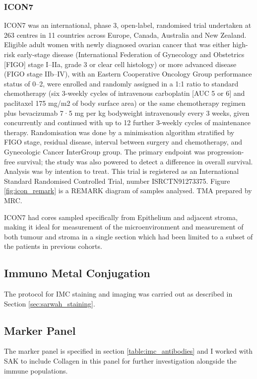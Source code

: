 \subsubsection{ICON7}
ICON7 was an international, phase 3, open-label, randomised trial undertaken at 263 centres in 11 countries across Europe, Canada, Australia and New Zealand. Eligible adult women with newly diagnosed ovarian cancer that was either high-risk early-stage disease (International Federation of Gynecology and Obstetrics [FIGO] stage I–IIa, grade 3 or clear cell histology) or more advanced disease (FIGO stage IIb–IV), with an Eastern Cooperative Oncology Group performance status of 0–2, were enrolled and randomly assigned in a 1:1 ratio to standard chemotherapy (six 3-weekly cycles of intravenous carboplatin [AUC 5 or 6] and paclitaxel 175 mg/m2 of body surface area) or the same chemotherapy regimen plus bevacizumab 7·5 mg per kg bodyweight intravenously every 3 weeks, given concurrently and continued with up to 12 further 3-weekly cycles of maintenance therapy. Randomisation was done by a minimisation algorithm stratified by FIGO stage, residual disease, interval between surgery and chemotherapy, and Gynecologic Cancer InterGroup group. The primary endpoint was progression-free survival; the study was also powered to detect a difference in overall survival. Analysis was by intention to treat. This trial is registered as an International Standard Randomised Controlled Trial, number ISRCTN91273375\cite{Perren2011Dec, BibEntry2020Jan}. Figure \ref{fig:icon_remark} is a REMARK diagram of samples analysed. TMA prepared by MRC.

ICON7 had cores sampled specifically from Epithelium and adjacent stroma, making it ideal for measurement of the microenvironment and measurement of both tumour and stroma in a single section which had been limited to a subset of the patients in previous cohorts.

\subsection{Immuno Metal Conjugation}
The protocol for IMC staining and imaging was carried out as described in Section \ref{sec:sarwah_staining}.

\subsection{Marker Panel}
The marker panel is specified in section \ref{table:imc_antibodies} and I worked with SAK to include Collagen in this panel for further investigation alongside the immune populations. 


